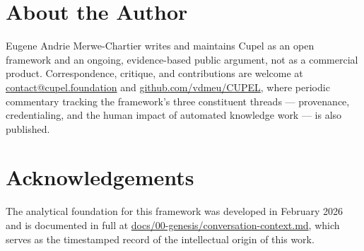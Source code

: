 \documentclass[11pt,a4paper]{article}
\begin{document}
\section*{About the Author}

Eugene Andrie Merwe-Chartier writes and maintains Cupel as an open framework and an ongoing,
evidence-based public argument, not as a commercial product. Correspondence, critique, and
contributions are welcome at \href{mailto:contact@cupel.foundation}{contact@cupel.foundation} and
\href{https://github.com/vdmeu/CUPEL}{github.com/vdmeu/CUPEL}, where periodic commentary tracking
the framework's three constituent threads — provenance, credentialing, and the human impact of
automated knowledge work — is also published.

\section*{Acknowledgements}

The analytical foundation for this framework was developed in February 2026 and is documented
in full at \href{https://github.com/vdmeu/CUPEL/blob/main/docs/00-genesis/conversation-context.md}{docs/00-genesis/conversation-context.md},
which serves as the timestamped record of the intellectual origin of this work.
\end{document}
